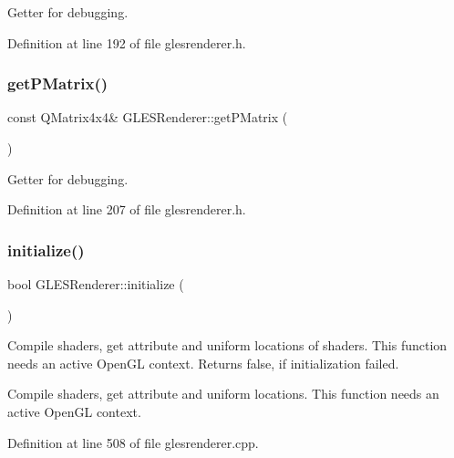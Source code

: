Getter for debugging. 

Definition at line 192 of file glesrenderer.\+h.

\mbox{\label{class_g_l_e_s_renderer_a57700c29516d33449e65e7243eaf2aac}} 
\subsubsection{\texorpdfstring{getPMatrix()}{getPMatrix()}}
{\footnotesize\ttfamily const Q\+Matrix4x4\& G\+L\+E\+S\+Renderer\+::get\+P\+Matrix (\begin{DoxyParamCaption}{ }\end{DoxyParamCaption})\hspace{0.3cm}{\ttfamily [inline]}}

Getter for debugging. 

Definition at line 207 of file glesrenderer.\+h.

\mbox{\label{class_g_l_e_s_renderer_a0bb1617bc39236ccbf430cd282f127f2}} 
\subsubsection{\texorpdfstring{initialize()}{initialize()}}
{\footnotesize\ttfamily bool G\+L\+E\+S\+Renderer\+::initialize (\begin{DoxyParamCaption}{ }\end{DoxyParamCaption})\hspace{0.3cm}{\ttfamily [virtual]}}

Compile shaders, get attribute and uniform locations of shaders. This function needs an active Open\+GL context. Returns false, if initialization failed.

Compile shaders, get attribute and uniform locations. This function needs an active Open\+GL context. 

Definition at line 508 of file glesrenderer.\+cpp.

\mbox{\label{class_g_l_e_s_renderer_a79ef99aaf1e080612cad7ce4e77580bd}} 
